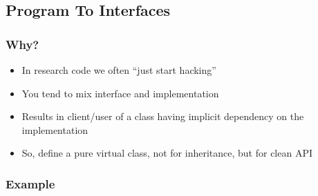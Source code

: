 \subsection{Program To Interfaces}\label{program-to-interfaces}

\subsubsection{Why?}\label{why}

\begin{itemize}
\itemsep1pt\parskip0pt
\item
  In research code we often ``just start hacking''
\item
  You tend to mix interface and implementation
\item
  Results in client/user of a class having implicit dependency on the
  implementation
\item
  So, define a pure virtual class, not for inheritance, but for clean
  API
\end{itemize}

\subsubsection{Example}\label{example}

